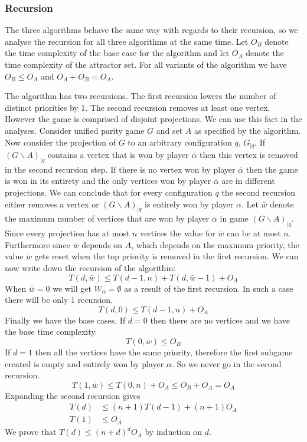 \subsubsection{Recursion} The three algorithms behave the same way with regards to their recursion, so we analyse the recursion for all three algorithms at the same time. Let $O_B$ denote the time complexity of the base case for the algorithm and let $O_A$ denote the time complexity of the attractor set. For all variants of the algorithm we have $O_B \leq O_A$ and $O_A + O_B = O_A$.

The algorithm has two recursions. The first recursion lowers the number of distinct priorities by 1. The second recursion removes at least one vertex. However the game is comprised of disjoint projections. We can use this fact in the analyses. Consider unified parity game $G$ and set $A$ as specified by the algorithm. Now consider the projection of $G$ to an arbitrary configuration $q$, $G_{|q}$. If $(G\backslash A)_{|q}$ contains a vertex that is won by player $\overline{\alpha}$ then this vertex is removed in the second recursion step. If there is no vertex won by player $\overline{\alpha}$ then the game is won in its entirety and the only vertices won by player $\overline{\alpha}$ are in different projections. We can conclude that for every configuration $q$ the second recursion either removes a vertex or $(G\backslash A)_{|q}$ is entirely won by player $\alpha$. Let $\bar{w}$ denote the maximum number of vertices that are won by player $\overline{\alpha}$ in game $(G\backslash A)_{|q}$. Since every projection has at most $n$ vertices the value for $\bar{w}$ can be at most $n$. Furthermore since $\bar{w}$ depends on $A$, which depends on the maximum priority, the value $\bar{w}$ gets reset when the top priority is removed in the first recursion. We can now write down the recursion of the algorithm:
\[ T(d,\bar{w}) \leq T(d-1,n) + T(d, \bar{w} - 1) + O_A \]
When $\bar{w} = 0$ we will get $W_{\overline{\alpha}} = \emptyset$ as a result of the first recursion. In such a case there will be only 1 recursion.
\[ T(d,0) \leq T(d-1,n) + O_A \]
Finally we have the base cases. If $d=0$ then there are no vertices and we have the base time complexity.
\[ T(0,\overline{w}) \leq O_B \]
If $d=1$ then all the vertices have the same priority, therefore the first subgame created is empty and entirely won by player $\alpha$. So we never go in the second recursion.
\[ T(1,\overline{w}) \leq T(0,n) + O_A \leq O_B + O_A = O_A \]
Expanding the second recursion gives
\begin{align*}
T(d) &\leq (n+1)T(d-1) + (n+1)O_A\\
T(1) &\leq O_A
\end{align*}
We prove that $T(d) \leq (n+d)^dO_A$ by induction on $d$.

